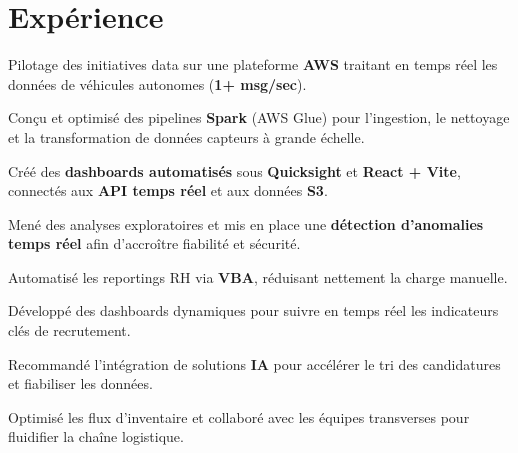 \documentclass[]{deedy-resume-reversed}
\begin{document}
\begin{minipage}[t]{0.60\textwidth}

\section{Expérience}

\vspace{\topsep}
\begin{tightemize}
    \item Pilotage des initiatives data sur une plateforme \textbf{AWS} traitant en temps réel les données de véhicules autonomes (\textbf{1+ msg/sec}).
    \item Conçu et optimisé des pipelines \textbf{Spark} (AWS Glue) pour l’ingestion, le nettoyage et la transformation de données capteurs à grande échelle.
    \item Créé des \textbf{dashboards automatisés} sous \textbf{Quicksight} et \textbf{React + Vite}, connectés aux \textbf{API temps réel} et aux données \textbf{S3}.
    \item Mené des analyses exploratoires et mis en place une \textbf{détection d’anomalies temps réel} afin d’accroître fiabilité et sécurité.
\end{tightemize}
\sectionsep

\begin{tightemize}
    \item Automatisé les reportings RH via \textbf{VBA}, réduisant nettement la charge manuelle.
    \item Développé des dashboards dynamiques pour suivre en temps réel les indicateurs clés de recrutement.
    \item Recommandé l’intégration de solutions \textbf{IA} pour accélérer le tri des candidatures et fiabiliser les données.
\end{tightemize}
\sectionsep

\begin{tightemize}
    \item Optimisé les flux d’inventaire et collaboré avec les équipes transverses pour fluidifier la chaîne logistique.
\end{tightemize}
\sectionsep


\end{minipage}
\end{document}
